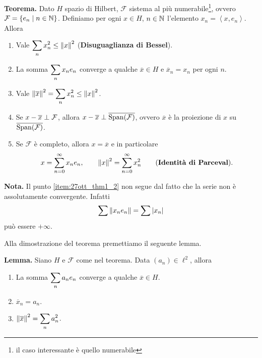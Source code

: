 \documentclass[a4paper, 12pt]{report}
\begin{document}
\textbf{Teorema.} Dato $H$ spazio di Hilbert, $\mathcal{F}$ sistema al più numerabile\footnote{il caso interessante è quello numerabile}, ovvero $\mathcal{F} = \left\{ e_n \;\middle|\; n \in \mathbb N \right\}$.
Definiamo per ogni $x \in H$, $n \in \mathbb N$ l'elemento $x_n = \left<x, e_n \right>$.
Allora
\begin{enumerate}
\item \label{item:27ott_thm1_1}
Vale $\displaystyle \sum_{n} x_n^2 \leq \left\lVert x \right\rVert^2$ (\textbf{Disuguaglianza di Bessel}).

\item \label{item:27ott_thm1_2}
La somma $\displaystyle \sum_n x_n e_n$ converge a qualche $\overline{x} \in H$ e $\overline{x}_n = x_n$  per ogni $n$.

\item \label{item:27ott_thm1_3}
Vale $\displaystyle \left\lVert \overline{x} \right\rVert^2 = \sum_n x_n^2 \leq \left\lVert x \right\rVert^2$.

\item \label{item:27ott_thm1_4}
Se $x - \overline{x} \; \bot \; \mathcal{F}$, allora $x - \overline{x} \; \bot \; \overline{\operatorname{Span}(\mathcal{F})}$, ovvero $\overline{x}$ è la proiezione di $x$ su $\overline{\operatorname{Span}(\mathcal{F})}$.

\item \label{item:27ott_thm1_5}
Se $\mathcal{F}$ è completo, allora $x = \overline{x}$ e in particolare
%
$$
x = \sum_{n=0}^{\infty} x_n e_n, \qquad \left\lVert x \right\rVert^2 = \sum_{n=0}^{\infty} x_n^2  \qquad \text{(\textbf{Identità di Parceval})}.
$$
%
\end{enumerate}

\textbf{Nota.} Il punto \ref{item:27ott_thm1_2} non segue dal fatto che la serie non è assolutamente convergente. Infatti
%
$$
\sum \left\lVert x_n e_n \right\rVert = \sum \left| x_n \right|
$$
%
può essere $+\infty$.


Alla dimostrazione del teorema premettiamo il seguente lemma.

\vs

\textbf{Lemma.} Siano $H$ e $\mathcal{F}$ come nel teorema.
Data $(a_n) \in \ell^2$, allora
\begin{enumerate}
\item La somma $\displaystyle \sum_n a_n e_n$ converge a qualche $\overline{x} \in H$. 

\item $\overline{x}_n = a_n$.

\item $\displaystyle \left\lVert \overline{x} \right\rVert^2 = \sum_n a_n^2$.
\end{enumerate}
\end{document}
